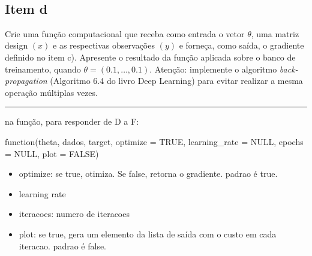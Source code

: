 \documentclass[
  a4paperpaper,
]{article}
\providecommand{\tightlist}{%
  \setlength{\itemsep}{0pt}\setlength{\parskip}{0pt}}\usepackage{longtable,booktabs,array}
\begin{document}
~

\subsection{Item d}\label{item-d}

Crie uma função computacional que receba como entrada o vetor
\(\theta\), uma matriz design \((x)\) e as respectivas observações
\((y)\) e forneça, como saída, o gradiente definido no item c).
Apresente o resultado da função aplicada sobre o banco de treinamento,
quando \(\theta = (0.1, \dots , 0.1)\). Atenção: implemente o algoritmo
\emph{back-propagation} (Algoritmo 6.4 do livro Deep Learning) para
evitar realizar a mesma operação múltiplas vezes.

\begin{center}\rule{0.5\linewidth}{0.5pt}\end{center}

na função, para responder de D a F:

function(theta, dados, target, optimize = TRUE, learning\_rate = NULL,
epochs = NULL, plot = FALSE)

\begin{itemize}
\tightlist
\item
  optimize: se true, otimiza. Se false, retorna o gradiente. padrao é
  true.
\item
  learning rate
\item
  iteracoes: numero de iteracoes
\item
  plot: se true, gera um elemento da lista de saída com o custo em cada
  iteracao. padrao é false.
\end{itemize}
\end{document}
